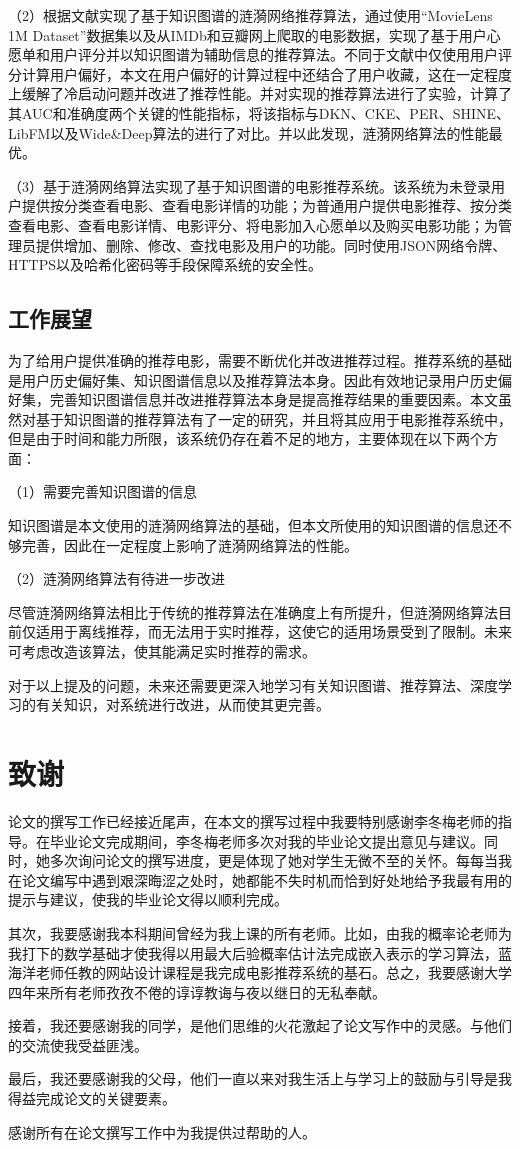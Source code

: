 \documentclass{bjfuthesis}
\begin{document}
（2）根据文献\parencite{wang2018ripplenet}实现了基于知识图谱的涟漪网络推荐算法，通过使用“MovieLens 1M Dataset”数据集以及从IMDb和豆瓣网上爬取的电影数据，实现了基于用户心愿单和用户评分并以知识图谱为辅助信息的推荐算法。不同于文献\parencite{wang2018ripplenet}中仅使用用户评分计算用户偏好，本文在用户偏好的计算过程中还结合了用户收藏，这在一定程度上缓解了冷启动问题并改进了推荐性能。并对实现的推荐算法进行了实验，计算了其AUC和准确度两个关键的性能指标，将该指标与DKN\cite{wang2018dkn}、CKE\cite{zhang2016collaborative}、PER\cite{yu2014personalized}、SHINE\cite{wang2018shine}、LibFM\cite{rendle2012factorization}以及Wide\&Deep\cite{cheng2016wide}算法的进行了对比。并以此发现，涟漪网络算法的性能最优。

（3）基于涟漪网络算法实现了基于知识图谱的电影推荐系统。该系统为未登录用户提供按分类查看电影、查看电影详情的功能；为普通用户提供电影推荐、按分类查看电影、查看电影详情、电影评分、将电影加入心愿单以及购买电影功能；为管理员提供增加、删除、修改、查找电影及用户的功能。同时使用JSON网络令牌、HTTPS以及哈希化密码等手段保障系统的安全性。
\section{工作展望}
为了给用户提供准确的推荐电影，需要不断优化并改进推荐过程。推荐系统的基础是用户历史偏好集、知识图谱信息以及推荐算法本身。因此有效地记录用户历史偏好集，完善知识图谱信息并改进推荐算法本身是提高推荐结果的重要因素。本文虽然对基于知识图谱的推荐算法有了一定的研究，并且将其应用于电影推荐系统中，但是由于时间和能力所限，该系统仍存在着不足的地方，主要体现在以下两个方面：

\noindent （1）需要完善知识图谱的信息

知识图谱是本文使用的涟漪网络算法的基础，但本文所使用的知识图谱的信息还不够完善，因此在一定程度上影响了涟漪网络算法的性能。

\noindent （2）涟漪网络算法有待进一步改进

尽管涟漪网络算法相比于传统的推荐算法在准确度上有所提升，但涟漪网络算法目前仅适用于离线推荐，而无法用于实时推荐，这使它的适用场景受到了限制。未来可考虑改造该算法，使其能满足实时推荐的需求。

对于以上提及的问题，未来还需要更深入地学习有关知识图谱、推荐算法、深度学习的有关知识，对系统进行改进，从而使其更完善。
	\backmatter
    \printbibliography
	\chapter{致谢}
论文的撰写工作已经接近尾声，在本文的撰写过程中我要特别感谢李冬梅老师的指导。在毕业论文完成期间，李冬梅老师多次对我的毕业论文提出意见与建议。同时，她多次询问论文的撰写进度，更是体现了她对学生无微不至的关怀。每每当我在论文编写中遇到艰深晦涩之处时，她都能不失时机而恰到好处地给予我最有用的提示与建议，使我的毕业论文得以顺利完成。

其次，我要感谢我本科期间曾经为我上课的所有老师。比如，由我的概率论老师为我打下的数学基础才使我得以用最大后验概率估计法完成嵌入表示的学习算法，蓝海洋老师任教的网站设计课程是我完成电影推荐系统的基石。总之，我要感谢大学四年来所有老师孜孜不倦的谆谆教诲与夜以继日的无私奉献。

接着，我还要感谢我的同学，是他们思维的火花激起了论文写作中的灵感。与他们的交流使我受益匪浅。

最后，我还要感谢我的父母，他们一直以来对我生活上与学习上的鼓励与引导是我得益完成论文的关键要素。

感谢所有在论文撰写工作中为我提供过帮助的人。
\end{document}
